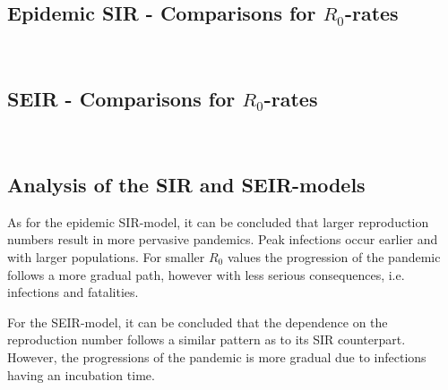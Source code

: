 \documentclass[12pt]{article}
\begin{document}
\subsection{Epidemic SIR - Comparisons for $R_0$-rates}
\begin{figure*}[ht!]
\begin{center}
   \\
   \caption{\label{workflow} (a) $R_0 = 2$, $\gamma = 1/18$ (b) $R_0 = 4$, $\gamma = 1/18$}
\end{center}
\end{figure*}
\subsection{SEIR - Comparisons for $R_0$-rates}
\begin{figure*}[ht!]
\begin{center}
   \\
   \caption{\label{workflow} (a) $R_0 = 2$, $\alpha = 1/5.2$, $\gamma = 1/18$ (b) $R_0 = 4$, $\alpha = 1/5.2$, $\gamma = 1/18$}
\end{center}
\end{figure*}
\subsection{Analysis of the SIR and SEIR-models}
As for the epidemic SIR-model, it can be concluded that larger reproduction numbers result in more pervasive pandemics. Peak infections occur earlier and with larger populations. For smaller $R_0$ values
the progression of the pandemic follows a more gradual path, however with less serious consequences, i.e. infections and fatalities. 

For the SEIR-model, it can be concluded that the dependence on the reproduction number follows a similar pattern as to its SIR counterpart. However, the progressions of the pandemic is more gradual due to infections having an incubation time.
\end{document}
